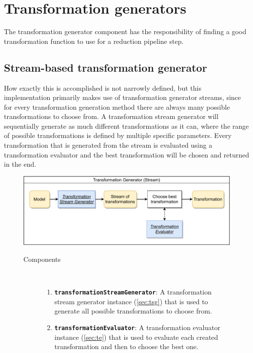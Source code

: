 \documentclass[
  a4paper,  %
  twoside,  %
  bibliography=totoc,
  headsepline,
  cleardoublepage=empty,
  parskip=half,
  draft=false
]{scrbook}
\begin{document}
\newpage

\section {Transformation generators}
\label{sec:tg}

The transformation generator component has the responsibility of finding a good transformation function to use for a reduction pipeline step.



\subsection {Stream-based transformation generator}

How exactly this is accomplished is not narrowly defined, but this implementation primarily makes use of transformation generator streams, since for every transformation generation method there are always many possible transformations to choose from.
A transformation stream generator will sequentially generate as much different transformations as it can, where the range of possible transformations is defined by multiple specific parameters.
Every transformation that is generated from the stream is evaluated using a transformation evaluator and the best transformation will be chosen and returned in the end.



\begin{figure}[H]
\includegraphics[width=\textwidth]{graphics/TransformationGen_Stream.pdf}
\vspace{-1.5mm}

\begin{mdframed}[linewidth=0.7px]

\begin{description}
\item[Components] {~ \begin{enumerate}[\indent{}]
\item \texttt{\textbf{transformationStreamGenerator}}: A transformation stream generator instance (\ref{sec:tsg}) that is used to generate all possible transformations to choose from.
\item \texttt{\textbf{transformationEvaluator}}: A transformation evaluator instance (\ref{sec:te}) that is used to evaluate each created transformation and then to choose the best one.
\end{enumerate}}
\end{description}

\end{mdframed}
\end{figure}
\end{document}
